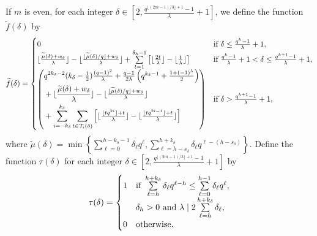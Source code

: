 \documentclass[journal,onecolumn]{IEEEtran}
\begin{document}
If  $m$ is even, for each integer $\delta\in \left[2, \frac{q^{\lfloor (2m-1)/3\rfloor+1}-1}{\lambda}+1\right]$, we define  the  function $\widetilde{f}(\delta)$ by 
 \begin{equation}\label{wf}
    \widetilde{f}(\delta)=\begin{cases}
        0 &\hbox{if }\delta\leq \frac{q^h-1}{\lambda}+1,\\     
         \lfloor \frac{\widetilde{\mu}(\delta)+w_{\delta}}{\lambda}\rfloor-\lfloor \frac{\lfloor\widetilde{\mu}(\delta)/q\rfloor+w_{\delta}}{\lambda}\rfloor
     +\sum\limits_{t=1}^{\delta_h-1}\left[ \lfloor \frac{2t}{\lambda}\rfloor - \lfloor \frac{t}{\lambda}\rfloor \right] &\hbox{if }\frac{q^h-1}{\lambda}+1<\delta\leq \frac{q^{h+1}-1}{\lambda}+1,\\
 \left({\begin{aligned}& q^{2k_{\delta}-2}(k_{\delta}-\textstyle\frac{1}{2})\textstyle\frac{(q-1)^2}{\lambda}  + \frac{q-1}{2\lambda}\left(q^{k_{\delta}-1}+ \textstyle\frac{1+(-1)^{\lambda}}{2}\right)\\& +  \lfloor \frac{\widetilde{\mu}(\delta)+w_{\delta}}{\lambda}\rfloor-\lfloor\textstyle \frac{\lfloor\widetilde{\mu}(\delta)/q\rfloor+w_{\delta}}{\lambda}\rfloor  \\
        &  +\sum\limits_{i=-k_{\delta}}^{k_{\delta}}\sum\limits_{t\in {\mathcal{T}}_i(\delta)}\left[\lfloor\textstyle \frac{\lfloor tq^{2i}\rfloor+t}{\lambda}\rfloor -\lfloor \textstyle\frac{\lfloor tq^{2i-1}\rfloor+t}{\lambda}\rfloor 
        \right] 
   \end{aligned}}\right)  
     &\hbox{if }\delta >\frac{q^{h+1}-1}{\lambda}+1, 
    \end{cases}
\end{equation}
where
$\widetilde{\mu}(\delta)=\min\left \{\sum\limits_{\ell=0}^{h-k_{\delta}-1}\delta_{\ell}q^{\ell}, \sum\limits_{\ell=h-s_{\delta}}^{h+k_{\delta}}\delta_{\ell}q^{\ell-(h-s_{\delta})}  \right\}.$
Define the function  $\tau(\delta)$ for each integer $\delta\in \left[2, \frac{q^{\lfloor (2m-1)/3\rfloor+1}-1}{\lambda}+1\right]$ by 
\begin{equation}\label{tau}
    \tau(\delta)=\begin{cases}
        1 &\hbox{if }\sum\limits_{\ell=h}^{h+k_{\delta}}\delta_{\ell}q^{\ell-h}\leq \sum\limits_{\ell=0}^{h-1}\delta_{\ell}q^{\ell},\\
        & \delta_h>0 \hbox{ and } \lambda \mid 2\sum\limits_{\ell=h}^{h+k_{\delta}}\delta_{\ell},\\
        0 &\hbox{otherwise.}   
    \end{cases}
\end{equation}
\end{document}
